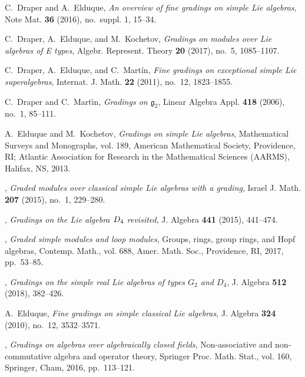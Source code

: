 \documentclass[12pt]{pdfathesis}
\begin{document}
\begin{thebibliography}{BHDSK17}
C.~Draper and A.~Elduque, \emph{An overview of fine gradings on simple {L}ie
  algebras}, Note Mat. \textbf{36} (2016), no.~suppl. 1, 15--34. 

C.~Draper, A.~Elduque, and M.~Kochetov, \emph{Gradings on modules over {L}ie
  algebras of {E} types}, Algebr. Represent. Theory \textbf{20} (2017), no.~5,
  1085--1107. 

C.~Draper, A.~Elduque, and C.~Mart{\'i}n, \emph{Fine gradings on exceptional
  simple {L}ie superalgebras}, Internat. J. Math. \textbf{22} (2011), no.~12,
  1823--1855. 

C.~Draper and C.~Mart\'{\i}n, \emph{Gradings on {${\mathfrak g}_2$}}, Linear
  Algebra Appl. \textbf{418} (2006), no.~1, 85--111. 

A.~Elduque and M.~Kochetov, \emph{Gradings on simple {L}ie algebras},
  Mathematical Surveys and Monographs, vol. 189, American Mathematical Society,
  Providence, RI; Atlantic Association for Research in the Mathematical
  Sciences (AARMS), Halifax, NS, 2013. 

\bysame, \emph{Graded modules over classical simple {L}ie algebras with a
  grading}, Israel J. Math. \textbf{207} (2015), no.~1, 229--280. 

\bysame, \emph{Gradings on the {L}ie algebra {$D\sb 4$} revisited}, J. Algebra
  \textbf{441} (2015), 441--474. 

\bysame, \emph{Graded simple modules and loop modules}, Groups, rings, group
  rings, and {H}opf algebras, Contemp. Math., vol. 688, Amer. Math. Soc.,
  Providence, RI, 2017, pp.~53--85. 

\bysame, \emph{Gradings on the simple real {L}ie algebras of types {$G_2$} and
  {$D_4$}}, J. Algebra \textbf{512} (2018), 382--426. 

A.~Elduque, \emph{Fine gradings on simple classical {L}ie algebras}, J. Algebra
  \textbf{324} (2010), no.~12, 3532--3571. 

\bysame, \emph{Gradings on algebras over algebraically closed fields},
  Non-associative and non-commutative algebra and operator theory, Springer
  Proc. Math. Stat., vol. 160, Springer, Cham, 2016, pp.~113--121. 


\end{thebibliography}
\end{document}
